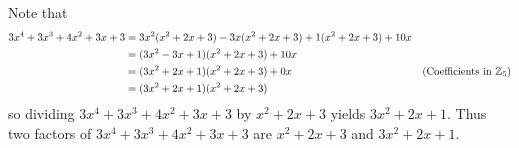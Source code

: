 \begin{questions}
    \item Note that
    \begin{align*}
        3x^4 + 3x^3 + 4x^2 + 3x + 3 &= 3x^2(x^2+2x+3) - 3x(x^2+2x+3) + 1(x^2+2x+3) + 10x\\
        &= (3x^2-3x+1)(x^2+2x+3) + 10x\\
        &= (3x^2+2x+1)(x^2+2x+3) + 0x & (\text{Coefficients in }\mathbb{Z}_5)\\
        &= (3x^2+2x+1)(x^2+2x+3)
    \end{align*}
    so dividing $3x^4 + 3x^3 + 4x^2 + 3x + 3$ by $x^2+2x+3$ yields $3x^2+2x+1$. Thus two factors of $3x^4 + 3x^3 + 4x^2 + 3x + 3$ are $x^2+2x+3$ and $3x^2+2x+1$.
\end{questions}
